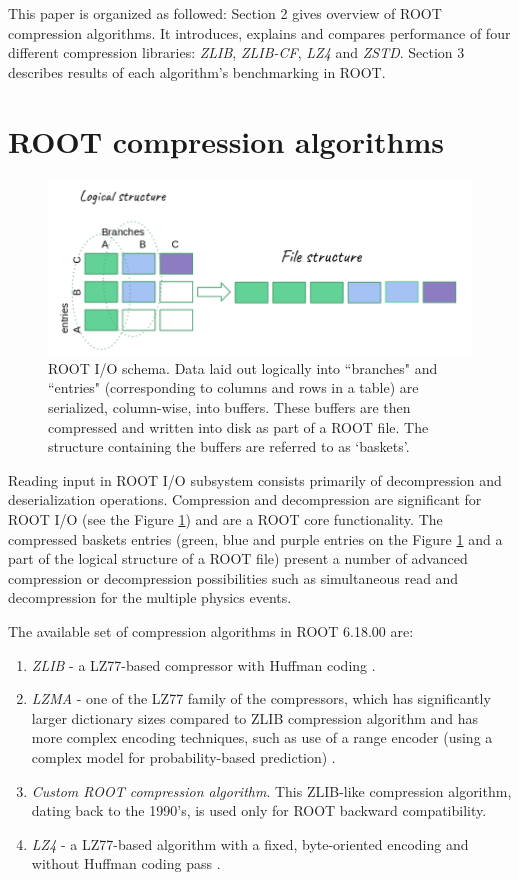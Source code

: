 \documentclass[12pt]{iopart}
\begin{document}
This paper is organized as followed: Section 2 gives overview of ROOT compression algorithms. It introduces, explains and compares performance of four different compression libraries: \textit{ZLIB}, \textit{ZLIB-CF}, \textit{LZ4} and \textit{ZSTD}. Section 3 describes results of each algorithm's benchmarking in ROOT.

\section{ROOT compression algorithms}

\begin{figure}[h]
\centering
\includegraphics[width=0.8\linewidth]{rootio1.png}
\caption{ROOT I/O schema.  Data laid out logically into ``branches" and ``entries" (corresponding to columns and rows in a table) are serialized, column-wise, into buffers.  These buffers are then compressed and written into disk as part of a ROOT file.  The structure containing the buffers are referred to as `baskets'.}
\label{fig:rootio}
\end{figure}

Reading input in ROOT I/O subsystem consists primarily of decompression and deserialization operations. Compression and decompression are significant for ROOT I/O (see the Figure \ref{fig:rootio}) and are a ROOT core functionality. The compressed baskets entries (green, blue and purple entries on the Figure \ref{fig:rootio} and a part of the logical structure of a ROOT file) present a number of advanced compression or decompression possibilities such as simultaneous read and decompression for the multiple physics events.

The available set of compression algorithms in ROOT 6.18.00 are:
\begin{enumerate}
    \item \textit{ZLIB} - a LZ77-based compressor with Huffman coding \cite{zlib}.
    \item \textit{LZMA} - one of the LZ77 family of the compressors, which has significantly larger dictionary sizes compared to ZLIB compression algorithm and has more complex encoding techniques, such as use of a range encoder (using a complex model for probability-based prediction) \cite{lzma}.
    \item \textit{Custom ROOT compression algorithm}.  This ZLIB-like compression algorithm, dating back to the 1990's, is used only for ROOT backward compatibility.
    \item \textit{LZ4} - a LZ77-based algorithm with a fixed, byte-oriented encoding and without Huffman coding pass \cite{lz4} \cite{brianzhe}.
\end{enumerate}
\end{document}
